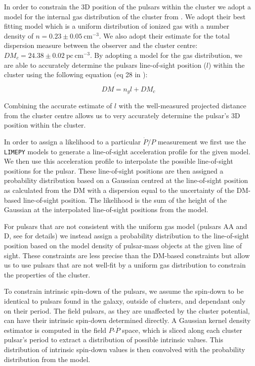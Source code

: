 In order to constrain the 3D position of the pulsars within the cluster we adopt a model for the
internal gas distribution of the cluster from \citet{Abbate2018}. We adopt their best fitting model
which is a uniform distribution of ionized gas with a number density of $n = 0.23 \pm 0.05 \
    \text{cm}^{-3}$. We also adopt their estimate for the total dispersion measure between the observer
and the cluster centre: $DM_c = 24.38 \pm 0.02 \ \mathrm{pc \ cm}^{-3}$. By adopting a model for the
gas distribution, we are able to accurately determine the pulsars line-of-sight position ($l$)
within the cluster using the following equation (eq 28 in \citet{Abbate2018}):

\begin{equation}
    DM = n_g l + DM_c
    \label{eq:DM-los}
\end{equation}

Combining the accurate estimate of $l$ with the well-measured projected distance from the cluster
centre allows us to very accurately determine the pulsar's 3D position within the cluster.

In order to assign a likelihood to a particular $\dot{P}/P$ measurement we first use the
\texttt{LIMEPY} models to generate a line-of-sight acceleration profile for the given model. We then
use this acceleration profile to interpolate the possible line-of-sight positions for the pulsar.
These line-of-sight positions are then assigned a probability distribution based on a Gaussian
centred at the line-of-sight position as calculated from the DM with a dispersion equal to the
uncertainty of the DM-based line-of-sight position. The likelihood is the sum of the height of the
Gaussian at the interpolated line-of-sight positions from the model.


For pulsars that are not consistent with the uniform gas model (pulsars AA and D, see
\citealt{Abbate2018} for details) we instead assign a probability distribution to the line-of-sight
position based on the model density of pulsar-mass objects at the given line of sight. These
constraints are less precise than the DM-based constraints but allow us to use pulsars that are not
well-fit by a uniform gas distribution to constrain the properties of the cluster.

To constrain intrinsic spin-down of the pulsars, we assume the spin-down to be identical to pulsars
found in the galaxy, outside of clusters, and dependant only on their period. The field pulsars, as
they are unaffected by the cluster potential, can have their intrinsic spin-down determined
directly. A Gaussian kernel density estimator is computed in the field $P$-$\dot{P}$ space, which is
sliced along each cluster pulsar's period to extract a distribution of possible intrinsic values.
This distribution of intrinsic spin-down values is then convolved with the probability distribution
from the model.

